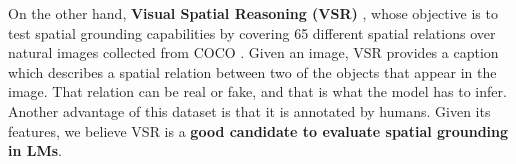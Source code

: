 On the other hand, \textbf{Visual Spatial Reasoning (VSR)} \cite{liu2022visual}, whose objective is to test spatial grounding capabilities by covering 65 different spatial relations over natural images collected from COCO \cite{lin2014microsoft}. Given an image, VSR provides a caption which describes a spatial relation between two of the objects that appear in the image. That relation can be real or fake, and that is what the model has to infer. Another advantage of this dataset is that it is annotated by humans. Given its features, we believe VSR is a \textbf{good candidate to evaluate spatial grounding in LMs}.